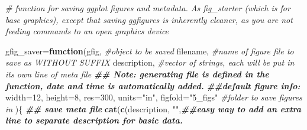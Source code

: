 \documentclass[
]{article}
\newenvironment{Shaded}{\begin{snugshade}}{\end{snugshade}}
\newcommand{\AttributeTok}[1]{\textcolor[rgb]{0.13,0.29,0.53}{#1}}
\newcommand{\CommentTok}[1]{\textcolor[rgb]{0.56,0.35,0.01}{\textit{#1}}}
\newcommand{\ControlFlowTok}[1]{\textcolor[rgb]{0.13,0.29,0.53}{\textbf{#1}}}
\newcommand{\DecValTok}[1]{\textcolor[rgb]{0.00,0.00,0.81}{#1}}
\newcommand{\DocumentationTok}[1]{\textcolor[rgb]{0.56,0.35,0.01}{\textbf{\textit{#1}}}}
\newcommand{\FunctionTok}[1]{\textcolor[rgb]{0.13,0.29,0.53}{\textbf{#1}}}
\newcommand{\NormalTok}[1]{#1}
\newcommand{\OtherTok}[1]{\textcolor[rgb]{0.56,0.35,0.01}{#1}}
\newcommand{\StringTok}[1]{\textcolor[rgb]{0.31,0.60,0.02}{#1}}
\begin{document}
\begin{Shaded}
\begin{Highlighting}[]
\CommentTok{\# function for saving ggplot figures and metadata. As fig\_starter (which is for base graphics), except that saving ggfigures is inherently cleaner, as you are not feeding commands to an open graphics device}

\NormalTok{gfig\_saver}\OtherTok{=}\ControlFlowTok{function}\NormalTok{(gfig, }\CommentTok{\#object to be saved}
\NormalTok{                    filename, }\CommentTok{\#name of figure file to save as WITHOUT SUFFIX}
\NormalTok{                    description, }\CommentTok{\#vector of strings, each will be put in its own line of meta file}
                    \DocumentationTok{\#\#  Note: generating file is defined in the function, date and time is automatically added.}
                    \DocumentationTok{\#\#default figure info:}
                    \AttributeTok{width=}\DecValTok{12}\NormalTok{,}
                    \AttributeTok{height=}\DecValTok{8}\NormalTok{,}
                    \AttributeTok{res=}\DecValTok{300}\NormalTok{,}
                    \AttributeTok{units=}\StringTok{"in"}\NormalTok{,}
                    \AttributeTok{figfold=}\StringTok{"5\_figs"} \CommentTok{\#folder to save figures in}
\NormalTok{)\{}
  \DocumentationTok{\#\# save meta file}
  \FunctionTok{cat}\NormalTok{(}\FunctionTok{c}\NormalTok{(description,}
        \StringTok{""}\NormalTok{,}\DocumentationTok{\#\#easy way to add an extra line to separate description for basic data.}
        

\end{Highlighting}
\end{Shaded}
\end{document}
